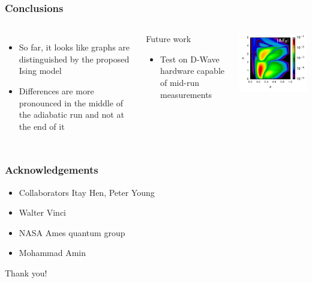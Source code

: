 \documentclass{beamer}
\begin{document}
\begin{frame}
  \frametitle{Conclusions}
  \begin{columns}
    \begin{itemize}
      \item So far, it looks like graphs are distinguished by the proposed
        Ising model
      \item Differences are more pronounced in the middle of the adiabatic run
        and not at the end of it
    \end{itemize}
    \begin{block}{Future work}
      \begin{itemize}
        \item Test on D-Wave hardware capable of mid-run measurements
      \end{itemize}
    \end{block}
    
    \includegraphics{delta-Eg}
  \end{columns}
\end{frame}

\begin{frame}
  \frametitle{Acknowledgements}
  \begin{itemize}
    \item Collaborators Itay Hen, Peter Young
    \item Walter Vinci
    \item NASA Ames quantum group
    \item Mohammad Amin
  \end{itemize}
  \vfill
  \begin{center}
    \huge Thank you!
  \end{center}
\end{frame}
\end{document}
